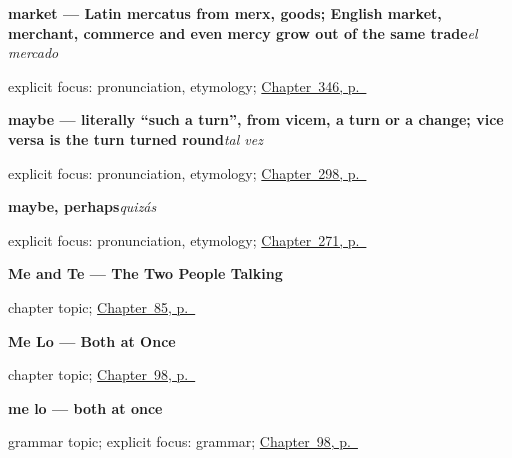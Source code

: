\noindent\begin{minipage}[t]{\linewidth}
\raggedright
\textbf{market — Latin mercatus from merx, goods; English market, merchant, commerce and even mercy grow out of the same trade}\enspace\emph{el mercado}\par
\footnotesize explicit focus: pronunciation, etymology; \hyperref[ch:lugares-del-pueblo]{Chapter~346, p.~\pageref*{ch:lugares-del-pueblo}}
\end{minipage}\par\smallskip

\noindent\begin{minipage}[t]{\linewidth}
\raggedright
\textbf{maybe — literally \textquotedblleft{}such a turn\textquotedblright{}, from vicem, a turn or a change; vice versa is the turn turned round}\enspace\emph{tal vez}\par
\footnotesize explicit focus: pronunciation, etymology; \hyperref[ch:mas-respuestas]{Chapter~298, p.~\pageref*{ch:mas-respuestas}}
\end{minipage}\par\smallskip

\noindent\begin{minipage}[t]{\linewidth}
\raggedright
\textbf{maybe, perhaps}\enspace\emph{quizás}\par
\footnotesize explicit focus: pronunciation, etymology; \hyperref[ch:ideas]{Chapter~271, p.~\pageref*{ch:ideas}}
\end{minipage}\par\smallskip

\noindent\begin{minipage}[t]{\linewidth}
\raggedright
\textbf{Me and Te --- The Two People Talking}\par
\footnotesize chapter topic; \hyperref[ch:pronoun-me-te]{Chapter~85, p.~\pageref*{ch:pronoun-me-te}}
\end{minipage}\par\smallskip

\noindent\begin{minipage}[t]{\linewidth}
\raggedright
\textbf{Me Lo --- Both at Once}\par
\footnotesize chapter topic; \hyperref[ch:double-object-order]{Chapter~98, p.~\pageref*{ch:double-object-order}}
\end{minipage}\par\smallskip

\noindent\begin{minipage}[t]{\linewidth}
\raggedright
\textbf{me lo — both at once}\par
\footnotesize grammar topic; explicit focus: grammar; \hyperref[ch:double-object-order]{Chapter~98, p.~\pageref*{ch:double-object-order}}
\end{minipage}\par\smallskip

